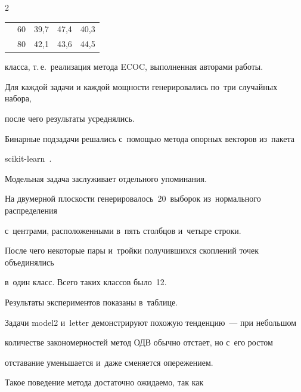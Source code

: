 \begin{multicols}{2}
{\begin{center}
\begin{tabular}{|c|c|c|c|c|}
    & 60 & 39,7 & 47,4 & 40,3 \\


    & 80 & 42,1 & 43,6 & 44,5 \\


  \hline


\end{tabular}


\end{center}}





\vspace*{6pt}








 


 \noindent


  класса, т.\,е.\ реализация метода ECOC, выполненная авторами работы.


Для каждой задачи и каждой мощности генерировались по~три случайных набора, 


после чего результаты усреднялись.


Бинарные подзадачи решались с~помощью метода опорных векторов из~пакета 


scikit-learn~\cite{scikit}.





Модельная задача заслуживает отдельного упоминания.


На двумерной плоскости генерировалось~20~выборок из~нормального распределения 


с~центрами, расположенными в~пять столбцов и~четыре строки.


После чего некоторые пары и~тройки получившихся скоплений точек объединялись 


в~один класс. Всего таких классов было~12.





Результаты экспериментов показаны в~таблице.


Задачи model2 и~letter демонстрируют похожую тенденцию~--- при небольшом 


количестве закономерностей метод ОДВ обычно отстает, но с~его ростом 


отставание уменьшается и~даже сменяется опережением.


Такое поведение метода достаточно ожидаемо, так как 



\end{multicols}
